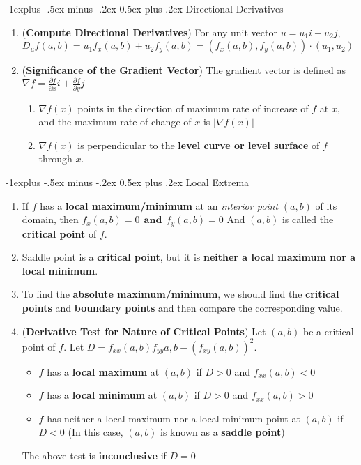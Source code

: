 \documentclass[10pt, landscape]{article}
\makeatletter
\renewcommand{\subsection}{\@startsection{subsection}{2}{0mm}%
                                {-1explus -.5ex minus -.2ex}%
                                {0.5ex plus .2ex}%
                                {\normalfont\normalsize\bfseries}}
\makeatother
\begin{document}
\begin{multicols}{4}
\subsection{Directional Derivatives}
\begin{enumerate}
    \item (\textbf{Compute Directional Derivatives}) For any unit vector $u=u_1i+u_2j$, $D_uf(a,b) = u_1f_x(a,b) + u_2f_y(a,b)=(f_x(a,b), f_y(a,b))\cdot(u_1,u_2)$
    \item (\textbf{Significance of the Gradient Vector}) The gradient vector is defined as $\nabla f = \frac{\partial f}{\partial x} i + \frac{\partial f}{\partial y}j$
    \begin{enumerate}
        \item $\nabla f(x)$ points in the direction of maximum rate of increase of $f$ at $x$, and the maximum rate of change of $x$ is $|\nabla f(x)|$
        \item $\nabla f(x)$ is perpendicular to the \textbf{level curve or level surface} of $f$ through $x$.
    \end{enumerate}
\end{enumerate}

\subsection{Local Extrema}
\begin{enumerate}
    \item If $f$ has a \textbf{local maximum/minimum} at an \textit{interior point} $(a,b)$ of its domain, then $f_x(a,b) = 0 ~~\textbf{and}~~ f_y(a,b) = 0$ And $(a,b)$ is called the \textbf{critical point} of $f$.
    \item Saddle point is a \textbf{critical point}, but it is \textbf{neither a local maximum nor a local minimum}.
    \item To find the \textbf{absolute maximum/minimum}, we should find the \textbf{critical points} and \textbf{boundary points} and then compare the corresponding value.
    \item (\textbf{Derivative Test for Nature of Critical Points}) Let $(a,b)$ be a critical point of $f$. Let $D=f_{xx}(a,b)f_{yy}{a,b} - (f_{xy}(a,b))^2$.
    \begin{itemize}
        \item $f$ has a \textbf{local maximum} at $(a,b)$ if $D > 0$ and $f_{xx}(a,b) < 0$
        \item $f$ has a \textbf{local minimum} at $(a,b)$ if $D > 0$ and $f_{xx}(a,b) > 0$
        \item $f$ has neither a local maximum nor a local minimum point at $(a,b)$ if $D < 0$ (In this case, $(a,b)$ is known as a \textbf{saddle point})
    \end{itemize}
    The above test is \textbf{inconclusive} if $D = 0$
\end{enumerate}


\end{multicols}
\end{document}
